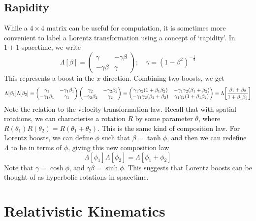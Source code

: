 \documentclass{article}
\begin{document}
\subsection{Rapidity}
While a $4\times 4$ matrix can be useful for computation, it is sometimes more convenient to label a Lorentz transformation using a concept of `rapidity'. In $1+1$ spacetime, we write
\[ \Lambda[\beta] = \begin{pmatrix}
		\gamma       & -\gamma\beta \\
		-\gamma\beta & \gamma
	\end{pmatrix};\quad \gamma = (1 - \beta^2)^{-\frac{1}{2}} \]
This represents a boost in the $x$ direction. Combining two boosts, we get
\[ \Lambda[\beta_1]\Lambda[\beta_2] = \begin{pmatrix}
		\gamma_1         & -\gamma_1\beta_1 \\
		-\gamma_1\beta_1 & \gamma_1
	\end{pmatrix}\begin{pmatrix}
		\gamma_2         & -\gamma_2\beta_2 \\
		-\gamma_2\beta_2 & \gamma_2
	\end{pmatrix} = \begin{pmatrix}
		\gamma_1\gamma_2(1 + \beta_1 \beta_2) & -\gamma_1\gamma_2(\beta_1 + \beta_2)  \\
		-\gamma_1\gamma_2(\beta_1 + \beta_2)  & \gamma_1\gamma_2(1 + \beta_1 \beta_2)
	\end{pmatrix} = \Lambda\qty[\frac{\beta_1 + \beta_2}{1 + \beta_1\beta_2}] \]
Note the relation to the velocity transformation law. Recall that with spatial rotations, we can characterise a rotation $R$ by some parameter $\theta$, where $R(\theta_1) R(\theta_2) = R(\theta_1 + \theta_2)$. This is the same kind of composition law. For Lorentz boosts, we can define $\phi$ such that $\beta = \tanh\phi$, and then we can redefine $\Lambda$ to be in terms of $\phi$, giving this new composition law
\[ \Lambda[\phi_1]\Lambda[\phi_2] = \Lambda[\phi_1 + \phi_2] \]
Note that $\gamma = \cosh \phi$, and $\gamma\beta = \sinh \phi$. This suggests that Lorentz boosts can be thought of as hyperbolic rotations in spacetime.

\section{Relativistic Kinematics}
\end{document}
